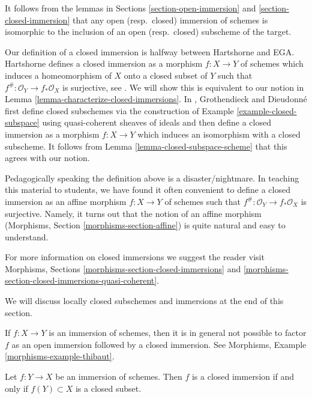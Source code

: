\noindent
It follows from the lemmas in Sections \ref{section-open-immersion} and
\ref{section-closed-immersion} that any open (resp.\ closed) immersion of
schemes is isomorphic to the inclusion of an open (resp.\ closed) subscheme
of the target.

\medskip\noindent
Our definition of a closed immersion is halfway between Hartshorne
and EGA. Hartshorne defines a closed immersion as a morphism $f : X \to Y$ of
schemes which induces a homeomorphism of $X$ onto a closed subset of
$Y$ such that $f^\# : \mathcal{O}_Y \to f_*\mathcal{O}_X$ is surjective, see
\cite[Page 85]{H}. We will show this is equivalent to our notion in
Lemma \ref{lemma-characterize-closed-immersions}. In \cite{EGA},
Grothendieck and Dieudonn\'e first define closed subschemes
via the construction of Example \ref{example-closed-subspace}
using quasi-coherent sheaves of ideals and then define a closed immersion
as a morphism $f : X \to Y$ which induces an isomorphism with a
closed subscheme. It follows from Lemma \ref{lemma-closed-subspace-scheme}
that this agrees with our notion.

\medskip\noindent
Pedagogically speaking the definition above is a disaster/nightmare.
In teaching this material to students, we have found it often
convenient to define a closed immersion as an affine morphism
$f : X \to Y$ of schemes such that $f^\# : \mathcal{O}_Y \to f_*\mathcal{O}_X$
is surjective. Namely, it turns out that the notion of an affine
morphism (Morphisms, Section \ref{morphisms-section-affine})
is quite natural and easy to understand.

\medskip\noindent
For more information on closed immersions we suggest the reader visit
Morphisms, Sections \ref{morphisms-section-closed-immersions} and
\ref{morphisms-section-closed-immersions-quasi-coherent}.

\medskip\noindent
We will discuss locally closed subschemes and immersions
at the end of this section.

\begin{remark}
\label{remark-not-reverse-open-closed}
If $f : X \to Y$ is an immersion of schemes, then it is in general
not possible to factor $f$ as an open immersion followed
by a closed immersion. See Morphisms, Example \ref{morphisms-example-thibaut}.
\end{remark}

\begin{lemma}
\label{lemma-immersion-when-closed}
Let $f : Y \to X$ be an immersion of schemes. Then $f$ is a closed
immersion if and only if $f(Y) \subset X$ is a closed subset.
\end{lemma}

